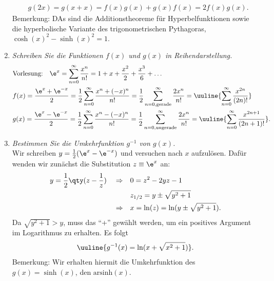 \begin{enumerate}[label=(\alph*)]
\begin{align}
        &g(2x) = g(x+x) = f(x)g(x) + g(x)f(x) = 2 f(x) g(x).
    \end{align}
    Bemerkung: DAs sind die Additionstheoreme für Hyperbelfunktionen sowie die hyperbolische Variante des trigonometrischen Pythagoras, $\cosh(x)^2 - \sinh(x)^2 = 1.$
    \item \emph{Schreiben Sie die Funktionen $f(x)$ und $g(x)$ in Reihendarstellung.}
    \begin{align}
        &\text{Vorlesung:} \quad \e^x = \sum_{n=0}^\infty \frac{x^n}{n!} = 1 + x + \frac{x^2}{2} + \frac{x^3}{6} + \hdots  \\
        &f(x) = \frac{\e^{x}+ \e^{-x}}{2} = \frac{1}{2}\sum_{n=0}^\infty \frac{x^n + (-x)^n }{n!} = \frac{1}{2} \sum_{n=0, \text{gerade}}^\infty \frac{2 x^n}{n!} = \uuline{\sum_{n=0}^\infty \frac{x^{2n}}{(2n)!}} \\
        &g(x) = \frac{\e^{x}- \e^{-x}}{2} = \frac{1}{2}\sum_{n=0}^\infty \frac{x^n - (-x)^n }{n!} = \frac{1}{2} \sum_{n=0, \text{ungerade}}^\infty \frac{2 x^n}{n!} = \uuline{\sum_{n=0}^\infty \frac{x^{2n+1}}{(2n+1)!}}.
    \end{align}
    \item \emph{Bestimmen Sie die Umkehrfunktion $g^{-1}$ von $g(x)$.}\\
    Wir schreiben $y = \frac{1}{2}(\e^x - \e^{-x})$ und versuchen nach $x$ aufzulösen. Dafür wenden wir zunächst die Substitution $z \equiv \e^x$ an: 
    \begin{align}
        y = \frac{1}{2}\qty(z - \frac{1}{z}) \quad \Rightarrow &\quad 0 = z^2 - 2y z -1  \\
        &\quad z_{1/2} = y \pm \sqrt{y^2 +1} \\
        \Rightarrow & \quad x = \ln(z) = \ln(y \pm \sqrt{y^2+1}).
    \end{align}
    Da $\sqrt{y^2 +1} > y$, muss das ``+'' gewählt werden, um ein positives Argument im Logarithmus zu erhalten. Es folgt 
    \begin{align}
        \uuline{g^{-1}(x) = \ln(x+\sqrt{x^2+1})}.
    \end{align}
    Bemerkung: Wir erhalten hiermit die Umkehrfunktion des $g(x) = \sinh(x)$, den $\text{arsinh}(x)$.
\end{enumerate}